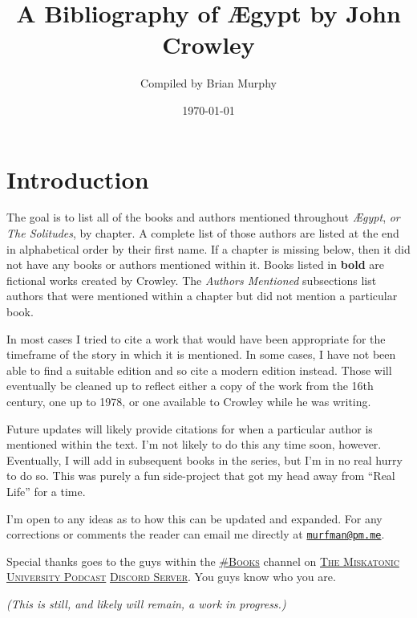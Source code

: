 \documentclass[12pt]{article}
\title{A Bibliography of Ægypt by John Crowley}
\author{Compiled by Brian Murphy}
\date{\today}
\begin{document}
{\let\cleardoublepage\clearpage 
\maketitle
}

\section{Introduction}\label{introduction}

The goal is to list all of the books and authors mentioned throughout \emph{Ægypt}, \emph{or The Solitudes}, by chapter. A complete list of those authors are listed at the end in alphabetical order by their first name. If a chapter is missing below, then it did not have any books or authors mentioned within it. Books listed in \textbf{bold} are fictional works created by Crowley. The \emph{Authors Mentioned} subsections list authors that were mentioned within a chapter but did not mention a particular book.

In most cases I tried to cite a work that would have been appropriate for the timeframe of the story in which it is mentioned. In some cases, I have not been able to find a suitable edition and so cite a modern edition instead. Those will eventually be cleaned up to reflect either a copy of the work from the 16th century, one up to 1978, or one available to Crowley while he was writing.

Future updates will likely provide citations for when a particular author is mentioned within the text. I'm not likely to do this any time soon, however. Eventually, I will add in subsequent books in the series, but I'm in no real hurry to do so. This was purely a fun side-project that got my head away from ``Real Life'' for a time.

I'm open to any ideas as to how this can be updated and expanded. For any corrections or comments the reader can email me directly at \href{mailto:murfman@pm.me}{\nolinkurl{murfman@pm.me}}.

Special thanks goes to the guys within the \href{https://discord.com/channels/460145057975238714/474725139297337367}{\textsc{\#Books}} channel on \href{https://www.mu-podcast.com/}{\textsc{The Miskatonic University Podcast}} \href{https://discord.com/channels/460145057975238714/}{\textsc{Discord Server}}. You guys know who you are.

\bigskip 

\emph{(This is still, and likely will remain, a work in progress.)}
\end{document}
